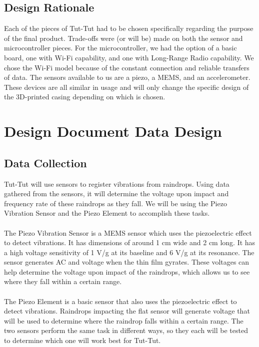 \documentclass[letterpaper,10pt,draftclsnofoot,onecolumn]{article}
\begin{document}
\subsection{Design Rationale}
Each of the pieces of Tut-Tut had to be chosen specifically regarding the purpose of the final product. Trade-offs were (or will be) made on both the sensor and microcontroller pieces. For the microcontroller, we had the option of a basic board, one with Wi-Fi capability, and one with Long-Range Radio capability. We chose the Wi-Fi model because of the constant connection and reliable transfers of data. The sensors available to us are a piezo, a MEMS, and an accelerometer. These devices are all similar in usage and will only change the specific design of the 3D-printed casing depending on which is chosen.


\section{Design Document Data Design}

\subsection{Data Collection}
Tut-Tut will use sensors to register vibrations from raindrops. Using data gathered from the sensors, it will determine the voltage upon impact and frequency rate of these raindrops as they fall. We will be using the Piezo Vibration Sensor and the Piezo Element to accomplish these tasks. 
\\
\\
The Piezo Vibration Sensor is a MEMS sensor which uses the piezoelectric effect to detect vibrations. It has dimensions of around 1 cm wide and 2 cm long. It has a high voltage sensitivity of 1 V/g at its baseline and 6 V/g at its resonance. The sensor generates AC and voltage when the thin film gyrates. These voltages can help determine the voltage upon impact of the raindrops, which allows us to see where they fall within a certain range.
\\
\\
The Piezo Element is a basic sensor that also uses the piezoelectric effect to detect vibrations. Raindrops impacting the flat sensor will generate voltage that will be used to determine where the raindrop falls within a certain range. The two sensors perform the same task in different ways, so they each will be tested to determine which one will work best for Tut-Tut.
\end{document}
